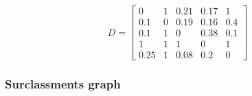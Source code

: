 \documentclass[\main/main.tex]{subfiles}
\begin{document}
\[
	D = \begin{bmatrix}
		0    & 1 & 0.21 & 0.17 & 1   \\
		0.1  & 0 & 0.19 & 0.16 & 0.4 \\
		0.1  & 1 & 0    & 0.38 & 0.1 \\
		1    & 1 & 1    & 0    & 1   \\
		0.25 & 1 & 0.08 & 0.2  & 0
	\end{bmatrix}
\]
\subsubsection*{Surclassments graph}


\begin{figure}
	\surclassmentGraph{}
\end{figure}
\end{document}
